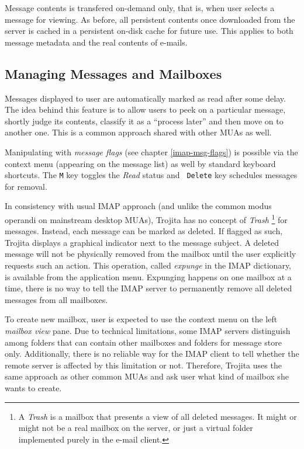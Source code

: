 \documentclass[12pt,notitlepage]{report}
\newcommand{\trojita}{Trojita\xspace}
\begin{document}
Message contents is transfered on-demand only, that is, when user selects a
message for viewing.  As before, all persistent contents once downloaded from
the server is cached in a persistent on-disk cache for future use.  This applies
to both message metadata and the real contents of e-mails.

\subsection{Managing Messages and Mailboxes}

Messages displayed to user are automatically marked as read after some delay.
The idea behind this feature is to allow users to peek on a particular message,
shortly judge its contents, classify it as a ``process later'' and then move on
to another one.  This is a common approach shared with other MUAs as well.

Manipulating with {\em message flags} (see chapter \ref{imap-msg-flags}) is possible
via the context menu (appearing on the message list) as well by standard
keyboard shortcuts.  The {\tt M} key toggles the {\em Read} status and {\tt
Delete} key schedules messages for removal.

In consistency with usual IMAP approach (and unlike the common modus operandi on
mainstream desktop MUAs), \trojita has no concept of {\em Trash}
\footnote{A {\em Trash} is a mailbox that presents a view of all deleted
messages.  It might or might not be a real mailbox on the server, or just a
virtual folder implemented purely in the e-mail client.} for
messages.  Instead, each message can be marked as deleted.  If flagged as such,
\trojita displays a graphical indicator next to the message subject.  A deleted
message will not be physically removed from the mailbox until the user explicitly
requests such an action.  This operation, called {\em expunge} in the IMAP
dictionary, is available from the application menu.  Expunging happens on one
mailbox at a time, there is no way to tell the IMAP server to permanently remove
all deleted messages from all mailboxes.

To create new mailbox, user is expected to use the context menu on the left {\em
mailbox view} pane.  Due to technical limitations, some IMAP servers distinguish
among folders that can contain other mailboxes and folders for message store
only.  Additionally, there is no reliable way for the IMAP client to tell
whether the remote server is affected by this limitation or not.  Therefore,
\trojita uses the same approach as other common MUAs and ask user what kind of
mailbox she wants to create.
\end{document}
